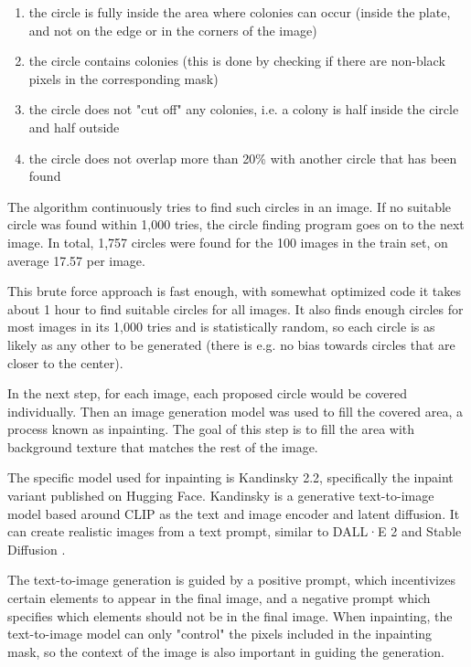 \begin{enumerate}
	\item the circle is fully inside the area where colonies can occur (inside the plate, and not on the edge or in the corners of the image)
	\item the circle contains colonies (this is done by checking if there are non-black pixels in the corresponding mask)
	\item the circle does not "cut off" any colonies, i.e. a colony is half inside the circle and half outside
	\item the circle does not overlap more than 20\% with another circle that has been found
\end{enumerate}

The algorithm continuously tries to find such circles in an image. If no suitable circle was found within 1,000 tries, the circle finding program goes on to the next image. In total, 1,757 circles were found for the 100 images in the train set, on average 17.57 per image.

This brute force approach is fast enough, with somewhat optimized code it takes about 1 hour to find suitable circles for all images. It also finds enough circles for most images in its 1,000 tries and is statistically random, so each circle is as likely as any other to be generated (there is e.g. no bias towards circles that are closer to the center).

In the next step, for each image, each proposed circle would be covered individually. Then an image generation model was used to fill the covered area, a process known as inpainting. The goal of this step is to fill the area with background texture that matches the rest of the image.

The specific model used for inpainting is Kandinsky 2.2, specifically the inpaint variant published on Hugging Face. \cite{kandinskyhf} Kandinsky is a generative text-to-image model based around CLIP as the text and image encoder and latent diffusion. \cite{razzhigaev2023kandinsky} It can create realistic images from a text prompt, similar to DALL·E 2 \cite{ramesh2022hierarchical} and Stable Diffusion \cite{rombach2022highresolution}.

The text-to-image generation is guided by a positive prompt, which incentivizes certain elements to appear in the final image, and a negative prompt which specifies which elements should not be in the final image. When inpainting, the text-to-image model can only "control" the pixels included in the inpainting mask, so the context of the image is also important in guiding the generation.

